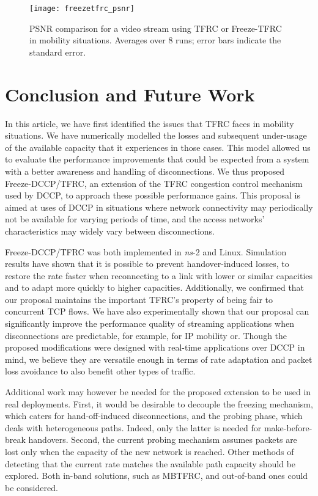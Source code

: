 \documentclass[twocolumn]{nictatechreport}
\newcommand{\ns}{\textit{ns}}
\begin{document}
\begin{figure}[tb]
  \centering
  \texttt{[image: freezetfrc\_psnr]}
  \caption[PSNR comparison for a video stream using TFRC or Freeze-TFRC in
  mobility situations]{PSNR comparison for a video stream using TFRC or
  Freeze-TFRC in mobility situations. Averages over 8 runs; error bars
  indicate the standard error.}
  \label{fig:freezetfrc_psnr}
\end{figure}



\section{Conclusion and Future Work}
\label{freezetfrc:conclusion}

In this article, we have first identified the issues that TFRC faces in
mobility situations.  We have numerically modelled the losses and subsequent
under-usage of the available capacity that it experiences in those cases. This
model allowed us to evaluate the performance improvements that could be expected
from a system with a better awareness and handling of disconnections.  We thus
proposed Freeze-DCCP/TFRC, an extension of the TFRC congestion control
mechanism used by DCCP, to approach these possible performance gains. This
proposal is aimed at uses of DCCP in situations where network connectivity may
periodically not be available for varying periods of time, and the access
networks' characteristics may widely vary between disconnections.

Freeze-DCCP/TFRC was both implemented in \ns-2 and Linux. Simulation results
have shown that it is possible to prevent handover-induced losses, to restore
the rate faster when reconnecting to a link with lower or similar capacities and
to adapt more quickly to higher capacities.  Additionally, we confirmed that our
proposal maintains the important TFRC's property of being fair to concurrent TCP
flows.  We have also experimentally shown that our proposal can significantly
improve the performance quality of streaming applications when disconnections
are predictable, for example, for IP mobility or.  Though the proposed
modifications were designed with real-time applications over DCCP in mind, we
believe they are versatile enough in terms of rate adaptation and packet loss
avoidance to also benefit other types of traffic.

Additional work may however be needed for the proposed extension to be used in
real deployments.  First, it would be desirable to decouple the freezing
mechanism, which caters for hand-off-induced disconnections, and the probing
phase, which deals with heterogeneous paths. Indeed, only the latter is needed
for make-before-break handovers. Second, the current probing mechanism assumes
packets are lost only when the capacity of the new network is reached.  Other
methods of detecting that the current rate matches the available path capacity
should be explored.  Both in-band solutions, such as MBTFRC, and out-of-band
ones could be considered.

\printbibliography 
\end{document}
